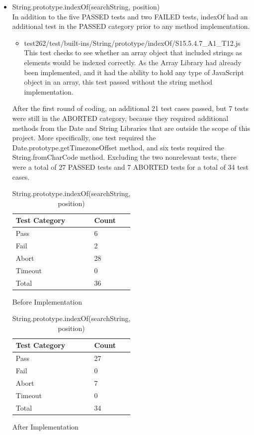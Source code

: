 \documentclass[a4paper,11pt,twoside]{report}
\begin{document}
\begin{itemize}
\item String.prototype.indexOf(searchString, position) \\
In addition to the five PASSED tests and two FAILED tests, indexOf had an additional test in the PASSED category prior to any method implementation.
\begin{itemize}
\item test262/test/built-ins/String/prototype/indexOf/S15.5.4.7\_A1\_T12.js \\
This test checks to see whether an array object that included strings as elements would be indexed correctly. As the Array Library had already been implemented, and it had the ability to hold any type of JavaScript object in an array, this test passed without the string method implementation.
\end{itemize}
After the first round of coding, an additional 21 test cases passed, but 7 tests were still in the ABORTED category, because they required additional methods from the Date and String Libraries that are outside the scope of this project. More specifically, one test required the Date.prototype.getTimezoneOffset method, and six tests required the String.fromCharCode method. Excluding the two nonrelevant tests, there were a total of 27 PASSED tests and 7 ABORTED tests for a total of 34 test cases.
\begin{table}[ht!]
\centering
\begin{subtable}{0.5\textwidth}
\centering
\begin{tabular}{|p{3cm}|p{2cm}|} \hline
\textbf{Test Category} & \textbf{Count} \\ \hline
Pass & 6 \\
Fail & 2 \\
Abort & 28 \\
Timeout & 0 \\
Total & 36 \\ \hline
\end{tabular}
\caption{Before Implementation}
\end{subtable}%
\begin{subtable}{0.5\textwidth}
\centering
\begin{tabular}{|p{3cm}|p{2cm}|} \hline
\textbf{Test Category} & \textbf{Count} \\ \hline
Pass & 27 \\
Fail & 0 \\
Abort & 7 \\
Timeout & 0 \\
Total & 34 \\ \hline
\end{tabular}
\caption{After Implementation}
\end{subtable}
\caption{String.prototype.indexOf(searchString, position)}
\end{table}


\end{itemize}
\end{document}
